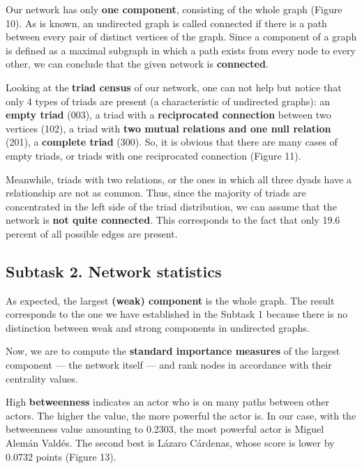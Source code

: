 
Our network has only \textbf{one component}, consisting of the whole graph (Figure 10). As is known, an undirected graph is called connected if there is a path between every pair of distinct vertices of the graph. Since a component of a graph is defined as a maximal subgraph in which a path exists from every node to every other, we can conclude that the given network is \textbf{connected}.


Looking at the \textbf{triad census} of our network, one can not help but notice that only 4 types of triads are present (a characteristic of undirected graphs): an \textbf{empty triad} (003), a triad with a \textbf{reciprocated connection} between two vertices (102), a triad with \textbf{two mutual relations and one null relation} (201), a \textbf{complete triad} (300). So, it is obvious that there are many cases of empty triads, or triads with one reciprocated connection (Figure 11). 

Meanwhile, triads with two relations, or the ones in which all three dyads have a relationship are not as common. Thus, since the majority of triads are concentrated in the left side of the triad distribution, we can assume that the network is \textbf{not quite connected}. This corresponds to the fact that only 19.6 percent of all possible edges are present.

\FloatBarrier
\clearpage


\subsection{Subtask 2. Network statistics}
As expected, the largest \textbf{(weak) component} is the whole graph. The result corresponds to the one we have established in the Subtask 1 because there is no distinction between weak and strong components in undirected graphs.

\FloatBarrier

Now, we are to compute the \textbf{standard importance measures} of the largest component — the network itself — and rank nodes in accordance with their centrality values.

High \textbf{betweenness} indicates an actor who is on many paths between other actors. The higher the value, the more powerful the actor is. In our case, with the betweenness value amounting to 0.2303, the most powerful actor is Miguel Alemán Valdés. The second best is Lázaro Cárdenas, whose score is lower by 0.0732 points (Figure 13).

